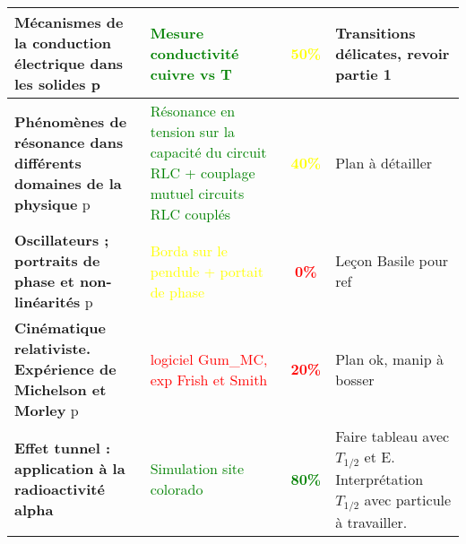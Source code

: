 \begin{changemargin}{-1.5cm}{-0cm}
\begin{center}
\begin{tabularx}{\paperwidth-2cm}{| X | X | c | X |}
  \hline
  \textbf{Mécanismes de la conduction électrique dans les solides} p\pageref{LP_Conduction} & \textcolor{green}{Mesure conductivité cuivre vs T} & \textcolor{yellow}{\textbf{50\%}} & Transitions délicates, revoir partie 1 \\
  \hline
  \textbf{Phénomènes de résonance dans différents domaines de la physique} p\pageref{LP_resonance} & \textcolor{green}{Résonance en tension sur la capacité du circuit RLC + couplage mutuel circuits RLC couplés} & \textcolor{yellow}{\textbf{40\%}} & Plan à détailler  \\
  \hline
  \textbf{Oscillateurs ; portraits de phase et non-linéarités} p\pageref{LP_PortaitPhase}~& \textcolor{yellow}{Borda sur le pendule + portait de phase} & \textcolor{red}{\textbf{0\%}} & Leçon Basile pour ref  \\
  \hline
  \hline
  \textbf{Cinématique relativiste. Expérience de Michelson et Morley} p\pageref{LP_CinematiqueRelativiste} & \textcolor{red}{logiciel Gum\_MC, exp Frish et Smith} & \textcolor{red}{\textbf{20\%}} & Plan ok, manip à bosser  \\
  \hline
  \textbf{Effet tunnel : application à la radioactivité alpha} & \textcolor{green}{Simulation site colorado} & \textcolor{green}{\textbf{80\%}} & Faire tableau avec $T_{1/2}$ et E. Interprétation $T_{1/2}$ avec particule à travailler. \\
  \hline
\end{tabularx}
\end{center}

\end{changemargin}